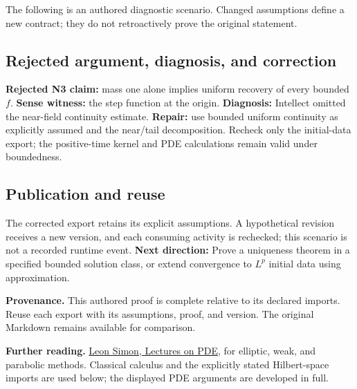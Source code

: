 \documentclass[preprint,12pt,aps,pra,showkeys,amsmath,amssymb,superscriptaddress,floatfix]{revtex4-2}
\theoremstyle{definition}
\theoremstyle{remark}
\begin{document}
The following is an authored diagnostic scenario. Changed assumptions
define a new contract; they do not retroactively prove the original
statement.

\subsection{Rejected argument, diagnosis, and correction}
\textbf{Rejected N3 claim:} mass one alone implies uniform recovery of
every bounded \(f\). \textbf{Sense witness:} the step function at the
origin. \textbf{Diagnosis:} Intellect omitted the near-field continuity
estimate. \textbf{Repair:} use bounded uniform continuity as explicitly
assumed and the near/tail decomposition. Recheck only the initial-data
export; the positive-time kernel and PDE calculations remain valid under
boundedness.

\subsection{Publication and reuse}
The corrected export retains its explicit assumptions. A hypothetical
revision receives a new version, and each consuming activity is
rechecked; this scenario is not a recorded runtime event. \textbf{Next
direction:} Prove a uniqueness theorem in a specified bounded solution
class, or extend convergence to \(L^p\) initial data using
approximation.

\par\medskip\begingroup\small\linespread{1.0}\selectfont\noindent\textbf{Provenance.} This authored proof is complete relative to its declared imports. Reuse
each export with its assumptions, proof, and version. The original
Markdown remains available for comparison.
\par\endgroup

\par\smallskip\begingroup\small\linespread{1.0}\selectfont\noindent\textbf{Further reading.} \href{https://math.stanford.edu/~lms/lecs-on-pde.pdf}{Leon Simon,
Lectures on PDE}, for elliptic, weak, and parabolic methods. Classical
calculus and the explicitly stated Hilbert-space imports are used below;
the displayed PDE arguments are developed in full.\par\endgroup
\end{document}
